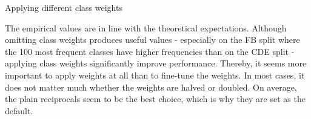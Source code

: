 \begin{table}[t]
    \centering
    
    \caption{Applying different class weights}
    \label{tab:5_experiments/4_texter/2_static/7_weight_factor/grid_search}
\end{table}

The empirical values are in line with the theoretical expectations. Although omitting class weights produces useful values - especially on the FB split where the 100 most frequent classes have higher frequencies than on the CDE split - applying class weights significantly improve performance. Thereby, it seems more important to apply weights at all than to fine-tune the weights. In most cases, it does not matter much whether the weights are halved or doubled. On average, the plain reciprocals seem to be the best choice, which is why they are set as the default.
